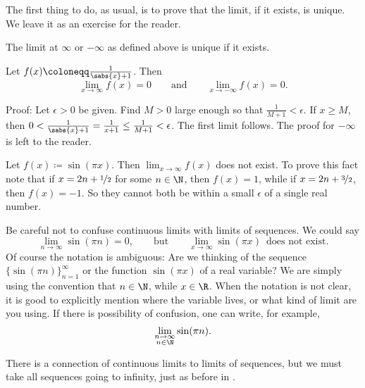 The first thing to do, as usual, is to prove that the limit, if it exists,
is unique.
We leave it as an exercise for the reader.

\begin{prop} \label{liminfty:unique}
The limit at $\infty$ or $-\infty$ as defined above is unique if it exists.
\end{prop}

\begin{example}
Let $f(x) \coloneqq \frac{1}{\sabs{x}+1}$.  Then
\begin{equation*}
\lim_{x\to \infty} f(x) = 0 \qquad \text{and} \qquad
\lim_{x\to -\infty} f(x) = 0 .
\end{equation*}

Proof:
Let $\epsilon > 0$ be given.  Find $M > 0$ large enough
so that $\frac{1}{M+1} < \epsilon$.  If
$x \geq M$, then $0 < \frac{1}{\sabs{x}+1} = \frac{1}{x+1} \leq \frac{1}{M+1} < \epsilon$.
The first limit follows.
The proof for $-\infty$ is left to the reader.
\end{example}

\begin{example}
Let $f(x) \coloneqq \sin(\pi x)$.  Then $\lim_{x\to\infty} f(x)$ does not exist.
To prove this fact note that if $x = 2n+\nicefrac{1}{2}$ for some $n \in
\N$, then $f(x)=1$,
while if $x = 2n+\nicefrac{3}{2}$, then $f(x)=-1$.  So they cannot both be
within a small $\epsilon$ of a single real number.

Be careful not to confuse continuous limits with limits of sequences.
We could say
\begin{equation*}
\lim_{n \to \infty} \sin(\pi n) = 0, \qquad \text{but} \qquad
\lim_{x \to \infty} \sin(\pi x) \enspace \text{does not exist}.
\end{equation*}
Of course the notation is ambiguous:  Are we thinking of the
sequence $\bigl\{ \sin (\pi n) \bigr\}_{n=1}^\infty$ or the function $\sin(\pi x)$
of a real variable?  We are simply using the convention
that $n \in \N$, while $x \in \R$.  When the notation is not clear,
it is good to explicitly mention where the variable lives, or what kind
of limit are you using.  If there is possibility of confusion, one can
write, for example,
\begin{equation*}
\lim_{\substack{n \to \infty\\n \in \N}} \sin(\pi n) .
\end{equation*}
\end{example}

There is a connection of continuous limits to limits of sequences, but we must take all
sequences going to infinity, just as before in .

